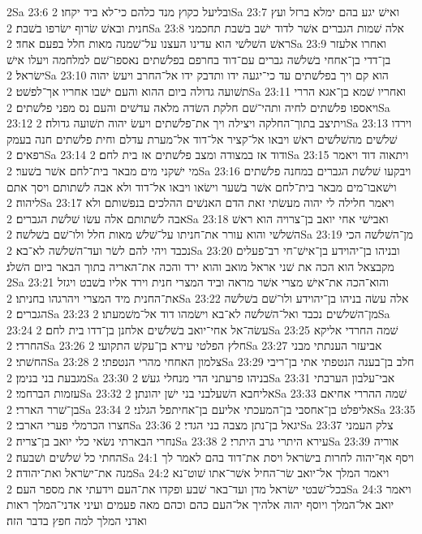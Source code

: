 2Sa 23:6  ובליעל כקוץ מנד כלהם כי־לא ביד יקחו׃
2Sa 23:7  ואישׁ יגע בהם ימלא ברזל ועץ חנית ובאשׁ שׂרוף ישׂרפו בשׁבת׃
2Sa 23:8  אלה שׁמות הגברים אשׁר לדוד ישׁב בשׁבת תחכמני ראשׁ השׁלשׁי הוא עדינו העצנו על־שׁמנה מאות חלל בפעם אחד׃
2Sa 23:9  ואחרו אלעזר בן־דדי בן־אחחי בשׁלשׁה גברים עם־דוד בחרפם בפלשׁתים נאספו־שׁם למלחמה ויעלו אישׁ ישׂראל׃
2Sa 23:10  הוא קם ויך בפלשׁתים עד כי־יגעה ידו ותדבק ידו אל־החרב ויעשׂ יהוה תשׁועה גדולה ביום ההוא והעם ישׁבו אחריו אך־לפשׁט׃
2Sa 23:11  ואחריו שׁמא בן־אגא הררי ויאספו פלשׁתים לחיה ותהי־שׁם חלקת השׂדה מלאה עדשׁים והעם נס מפני פלשׁתים׃
2Sa 23:12  ויתיצב בתוך־החלקה ויצילה ויך את־פלשׁתים ויעשׂ יהוה תשׁועה גדולה׃
2Sa 23:13  וירדו שׁלשׁים מהשׁלשׁים ראשׁ ויבאו אל־קציר אל־דוד אל־מערת עדלם וחית פלשׁתים חנה בעמק רפאים׃
2Sa 23:14  ודוד אז במצודה ומצב פלשׁתים אז בית לחם׃
2Sa 23:15  ויתאוה דוד ויאמר מי ישׁקני מים מבאר בית־לחם אשׁר בשׁער׃
2Sa 23:16  ויבקעו שׁלשׁת הגברים במחנה פלשׁתים וישׁאבו־מים מבאר בית־לחם אשׁר בשׁער וישׂאו ויבאו אל־דוד ולא אבה לשׁתותם ויסך אתם ליהוה׃
2Sa 23:17  ויאמר חלילה לי יהוה מעשׂתי זאת הדם האנשׁים ההלכים בנפשׁותם ולא אבה לשׁתותם אלה עשׂו שׁלשׁת הגברים׃
2Sa 23:18  ואבישׁי אחי יואב בן־צרויה הוא ראשׁ השׁלשׁי והוא עורר את־חניתו על־שׁלשׁ מאות חלל ולו־שׁם בשׁלשׁה׃
2Sa 23:19  מן־השׁלשׁה הכי נכבד ויהי להם לשׂר ועד־השׁלשׁה לא־בא׃
2Sa 23:20  ובניהו בן־יהוידע בן־אישׁ־חי רב־פעלים מקבצאל הוא הכה את שׁני אראל מואב והוא ירד והכה את־האריה בתוך הבאר ביום השׁלג׃
2Sa 23:21  והוא־הכה את־אישׁ מצרי אשׁר מראה וביד המצרי חנית וירד אליו בשׁבט ויגזל את־החנית מיד המצרי ויהרגהו בחניתו׃
2Sa 23:22  אלה עשׂה בניהו בן־יהוידע ולו־שׁם בשׁלשׁה הגברים׃
2Sa 23:23  מן־השׁלשׁים נכבד ואל־השׁלשׁה לא־בא וישׂמהו דוד אל־משׁמעתו׃
2Sa 23:24  עשׂה־אל אחי־יואב בשׁלשׁים אלחנן בן־דדו בית לחם׃
2Sa 23:25  שׁמה החרדי אליקא החרדי׃
2Sa 23:26  חלץ הפלטי עירא בן־עקשׁ התקועי׃
2Sa 23:27  אביעזר הענתתי מבני החשׁתי׃
2Sa 23:28  צלמון האחחי מהרי הנטפתי׃
2Sa 23:29  חלב בן־בענה הנטפתי אתי בן־ריבי מגבעת בני בנימן׃
2Sa 23:30  בניהו פרעתני הדי מנחלי געשׁ׃
2Sa 23:31  אבי־עלבון הערבתי עזמות הברחמי׃
2Sa 23:32  אליחבא השׁעלבני בני ישׁן יהונתן׃
2Sa 23:33  שׁמה ההררי אחיאם בן־שׁרר האררי׃
2Sa 23:34  אליפלט בן־אחסבי בן־המעכתי אליעם בן־אחיתפל הגלני׃
2Sa 23:35  חצרו הכרמלי פערי הארבי׃
2Sa 23:36  יגאל בן־נתן מצבה בני הגדי׃
2Sa 23:37  צלק העמני נחרי הבארתי נשׂאי כלי יואב בן־צריה׃
2Sa 23:38  עירא היתרי גרב היתרי׃
2Sa 23:39  אוריה החתי כל שׁלשׁים ושׁבעה׃
2Sa 24:1  ויסף אף־יהוה לחרות בישׂראל ויסת את־דוד בהם לאמר לך מנה את־ישׂראל ואת־יהודה׃
2Sa 24:2  ויאמר המלך אל־יואב שׂר־החיל אשׁר־אתו שׁוט־נא בכל־שׁבטי ישׂראל מדן ועד־באר שׁבע ופקדו את־העם וידעתי את מספר העם׃
2Sa 24:3  ויאמר יואב אל־המלך ויוסף יהוה אלהיך אל־העם כהם וכהם מאה פעמים ועיני אדני־המלך ראות ואדני המלך למה חפץ בדבר הזה׃

